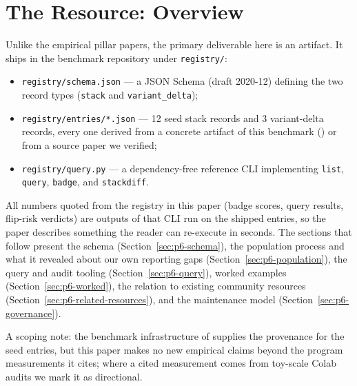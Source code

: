 \section{The Resource: Overview}
\label{sec:p6-overview}
Unlike the empirical pillar papers, the primary deliverable here is an
artifact. It ships in the benchmark repository under \texttt{registry/}:

\begin{itemize}[leftmargin=1.5em, itemsep=0.15em]
  \item \texttt{registry/schema.json} --- a JSON Schema (draft 2020-12)
        defining the two record types (\texttt{stack} and
        \texttt{variant_delta});
  \item \texttt{registry/entries/*.json} --- 12 seed stack records and 3
        variant-delta records, every one derived from a concrete artifact of
        this benchmark () or from a source paper we verified;
  \item \texttt{registry/query.py} --- a dependency-free reference CLI
        implementing \texttt{list}, \texttt{query}, \texttt{badge}, and
        \texttt{stackdiff}.
\end{itemize}

All numbers quoted from the registry in this paper (badge scores, query
results, flip-risk verdicts) are outputs of that CLI run on the shipped
entries, so the paper describes something the reader can re-execute in
seconds. The sections that follow present the schema
(Section~\ref{sec:p6-schema}), the population process and what it revealed
about our own reporting gaps (Section~\ref{sec:p6-population}), the query and
audit tooling (Section~\ref{sec:p6-query}), worked examples
(Section~\ref{sec:p6-worked}), the relation to existing community resources
(Section~\ref{sec:p6-related-resources}), and the maintenance model
(Section~\ref{sec:p6-governance}).

A scoping note: the benchmark infrastructure of  supplies
the provenance for the seed entries, but this paper makes no new empirical
claims beyond the program measurements it cites; where a cited measurement
comes from toy-scale Colab audits we mark it as directional.
